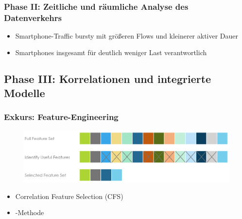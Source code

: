 \documentclass{beamer}
\begin{document}
\begin{frame}
  \frametitle{Phase II: Zeitliche und räumliche Analyse des Datenverkehrs}

  \begin{figure}[H]
    \centering
    \end{figure}

    \begin{itemize}
      \item Smartphone-Traffic bursty mit größeren Flows und kleinerer aktiver Dauer
      \item Smartphones insgesamt für deutlich weniger Last verantwortlich
    \end{itemize}
\end{frame}

\subsection{\textbf{Phase III}: Korrelationen und integrierte Modelle}

\begin{frame}
  \frametitle{Exkurs: Feature-Engineering}

  \begin{figure}
    \centering
    \includegraphics[width=\textwidth]{images/feature_engineering.png}
  \end{figure}

  \begin{itemize}
    \item Correlation Feature Selection (CFS)
    \item {}-Methode
  \end{itemize}  
\end{frame}
\end{document}
